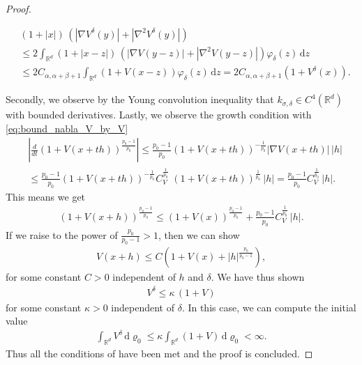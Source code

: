 \documentclass[reqno, 11pt]{amsart}
\numberwithin{equation}{section}
\theoremstyle{definition}
\begin{document}
\begin{proof}
\begin{itemize}
        \begin{align*}
            &(1+|x|)\,(|\nabla V^\delta (y)|+|\nabla^2 V^\delta(y)|)\\
            &\leq 2\int_{\mathbb{R}^{d}} (1+|x-z|)\,(|\nabla V(y-z)|+|\nabla^2 V(y-z)|)\varphi_\delta(z)\,\mathrm{d} z\\
            &\leq 2C_{\alpha,\alpha+\beta+1}\int_{\mathbb{R}^{d}} (1+V(x-z))\varphi_\delta(z)\,\mathrm{d} z
            =2C_{\alpha,\alpha+\beta+1}(1+V^\delta(x)).
        \end{align*}
    \end{itemize}
    Secondly, we observe by the Young convolution inequality that $k_{\sigma,\delta}\in C^4(\mathbb{R}^{d})$ with bounded derivatives. Lastly, we observe the growth condition with \eqref{eq:bound_nabla_V_by_V}
    \begin{align*}
        &\left|\frac{d}{dt}(1+V(x+th))^{\frac{p_0-1}{p_0}}\right|
        \leq \frac{p_0-1}{p_0}(1+V(x+th))^{-\frac{1}{p_0}}|\nabla V(x+th)|\,|h|\\
        &\leq \frac{p_0-1}{p_0}(1+V(x+th))^{-\frac{1}{p_0}} C_V^{\frac{1}{p_0}}\;(1+V(x+th))^{\frac{1}{p_0}}\,|h|
        =\frac{p_0-1}{p_0}C_V^{\frac{1}{p_0}}\,|h|.
    \end{align*}
    This means we get
    \begin{align*}
        (1+V(x+h))^{\frac{p_0-1}{p_0}}
        \leq (1+V(x))^{\frac{p_0-1}{p_0}}+\frac{p_0-1}{p_0}C_V^{\frac{1}{p_0}}\,|h|.
    \end{align*}
    If we raise to the power of $\tfrac{p_0}{p_0-1}>1$, then we can show
    \begin{align*}
        V(x+h)\leq C(1+V(x)+|h|^{\frac{p_0}{p_0-1}}),
    \end{align*}
    for some constant $C>0$ independent of $h$ and $\delta$. We have thus shown
    \begin{align}
        \label{eq:moll_V_bnd_by_V}
        V^\delta\leq \kappa\,(1+V)
    \end{align}
    for some constant $\kappa>0$ independent of $\delta$. In this case, we can compute the initial value
    \begin{align*}
        \int_{\mathbb{R}^{d}} V^\delta \,\mathrm{d} \varrho_0
        \leq \kappa\int_{\mathbb{R}^{d}} (1+V) \,\mathrm{d}\varrho_0
        <\infty.
    \end{align*}
    Thus all the conditions of \cite[Theorem 2.4]{lu_lu_nolen_2019_scaling} have been met and the proof is concluded.
\end{proof}
\end{document}
